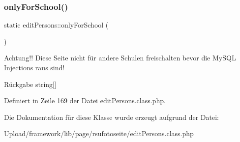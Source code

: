 \subsubsection{\texorpdfstring{only\+For\+School()}{onlyForSchool()}}
{\footnotesize\ttfamily static edit\+Persons\+::only\+For\+School (\begin{DoxyParamCaption}{ }\end{DoxyParamCaption})\hspace{0.3cm}{\ttfamily [static]}}

Achtung!! Diese Seite nicht für andere Schulen freischalten bevor die My\+S\+QL Injections raus sind! \begin{DoxyReturn}{Rückgabe}
string\mbox{[}\mbox{]} 
\end{DoxyReturn}


Definiert in Zeile 169 der Datei edit\+Persons.\+class.\+php.



Die Dokumentation für diese Klasse wurde erzeugt aufgrund der Datei\+:\begin{DoxyCompactItemize}
\item 
Upload/framework/lib/page/rsufotoseite/edit\+Persons.\+class.\+php\end{DoxyCompactItemize}
